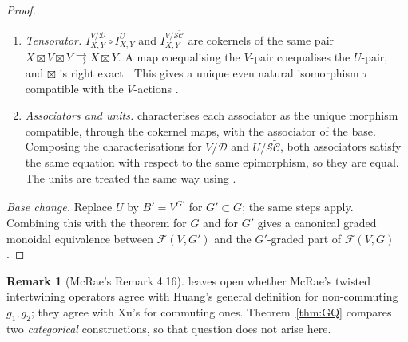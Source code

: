 \documentclass[11pt]{article}
\theoremstyle{definition}
\newtheorem{remark}[theorem]{Remark}
\newcommand{\cC}{\mathcal C}
\newcommand{\cD}{\mathcal D}
\newcommand{\cF}{\mathcal F}
\newcommand{\SC}{\mathcal S\widetilde{\mathcal C}}
\newcommand{\Rep}{\operatorname{Rep}}
\newcommand{\tG}{\widetilde G}
\begin{document}
\begin{proof}
\begin{enumerate}[nosep]
\begin{itemize}[nosep]
\item \emph{Local modules to Rep U.} The locality condition $\mu\circ M_{U,-}=\mu$ passes to
quotients by naturality of $M$ and surjectivity of the quotient map. So $\Rep^0U$ is closed under
these cokernels, and cokernels in $\Rep^0U$ are cokernels in $\Rep U$ \cite[Thm~2.55,
Prop.~2.56]{CKM}.
\item \emph{All three split.} $\widetilde\cC$ is semisimple because $U_0$ is regular, and $U$ and
$V$ are separable. So each coequaliser defining a relative tensor product is split by a
separability idempotent, and split coequalisers are preserved by every additive functor.
\end{itemize}
In particular the forgetful functors $\Rep^0U\to\Rep U\to\SC$ preserve the cokernels used in
the next step. Without this, a cokernel internal to the local-module category need not be a
cokernel in the ambient category.
\item \emph{Tensorator.} $I^{V/\cD}_{X,Y}\circ I^U_{X,Y}$ and $I^{V/\SC}_{X,Y}$ are cokernels of
the same pair $X\boxtimes V\boxtimes Y\rightrightarrows X\boxtimes Y$. A map coequalising the
$V$-pair coequalises the $U$-pair, and $\boxtimes$ is right exact \cite[Prop.~2.23]{CKM}. This
gives a unique even natural isomorphism $\tau$ compatible with the $V$-actions
\cite[Props.~2.38, 2.39, 2.46, 2.47]{CKM}.
\item \emph{Associators and units.} \cite[Thm~2.52]{CKM} characterises each associator as the
unique morphism compatible, through the cokernel maps, with the associator of the base. Composing
the characterisations for $V/\cD$ and $U/\SC$, both associators satisfy the same equation with
respect to the same epimorphism, so they are equal. The units are treated the same way using
\cite[Props.~2.40, 2.42]{CKM}.
\end{enumerate}
\emph{Base change.} Replace $U$ by $B'=V^{\tG'}$ for $G'\subset G$; the same steps apply.
Combining this with the theorem for $G$ and for $G'$ gives a canonical graded monoidal
equivalence between $\cF(V,G')$ and the $G'$-graded part of $\cF(V,G)$.
\end{proof}

\begin{remark}[McRae's Remark 4.16]\label{rem:4.16}
\cite[Rem.~4.16]{McR} leaves open whether McRae's twisted intertwining operators agree with
Huang's general definition for non-commuting $g_1,g_2$; they agree with Xu's for commuting ones.
Theorem~\ref{thm:GQ} compares two \emph{categorical} constructions, so that question does not
arise here.
\end{remark}
\end{document}
